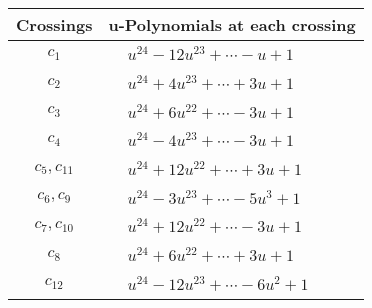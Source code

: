 \documentclass[1p]{elsarticle_modified}
\theoremstyle{definition}
\begin{document}
\begin{tabular}{m{50pt}|m{274pt}}
Crossings & \hspace{64pt}u-Polynomials at each crossing \\
\hline $$\begin{aligned}c_{1}\end{aligned}$$&$\begin{aligned}
&u^{24}-12 u^{23}+\cdots- u+1
\end{aligned}$\\
\hline $$\begin{aligned}c_{2}\end{aligned}$$&$\begin{aligned}
&u^{24}+4 u^{23}+\cdots+3 u+1
\end{aligned}$\\
\hline $$\begin{aligned}c_{3}\end{aligned}$$&$\begin{aligned}
&u^{24}+6 u^{22}+\cdots-3 u+1
\end{aligned}$\\
\hline $$\begin{aligned}c_{4}\end{aligned}$$&$\begin{aligned}
&u^{24}-4 u^{23}+\cdots-3 u+1
\end{aligned}$\\
\hline $$\begin{aligned}c_{5},c_{11}\end{aligned}$$&$\begin{aligned}
&u^{24}+12 u^{22}+\cdots+3 u+1
\end{aligned}$\\
\hline $$\begin{aligned}c_{6},c_{9}\end{aligned}$$&$\begin{aligned}
&u^{24}-3 u^{23}+\cdots-5 u^3+1
\end{aligned}$\\
\hline $$\begin{aligned}c_{7},c_{10}\end{aligned}$$&$\begin{aligned}
&u^{24}+12 u^{22}+\cdots-3 u+1
\end{aligned}$\\
\hline $$\begin{aligned}c_{8}\end{aligned}$$&$\begin{aligned}
&u^{24}+6 u^{22}+\cdots+3 u+1
\end{aligned}$\\
\hline $$\begin{aligned}c_{12}\end{aligned}$$&$\begin{aligned}
&u^{24}-12 u^{23}+\cdots-6 u^2+1
\end{aligned}$\\
\hline
\end{tabular}\\~\\
\end{document}
